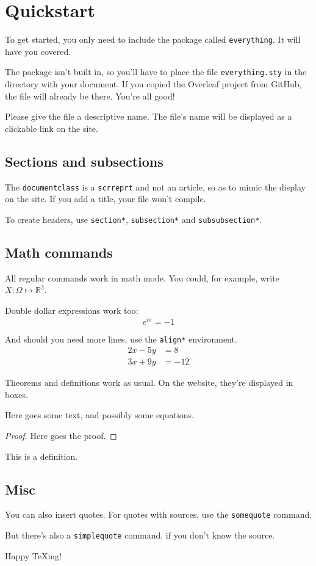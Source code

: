 \documentclass{scrreprt}
\begin{document}
\section*{Quickstart}
To get started, you only need to include the package called \texttt{everything}. It will have you covered.

The package isn't built in, so you'll have to place the file \texttt{everything.sty} in the directory with your document. If you copied the Overleaf project from GitHub, the file will already be there. You're all good!

Please give the file a descriptive name. The file's name will be displayed as a clickable link on the site.

\subsection*{Sections and subsections}
The \texttt{documentclass} is a \texttt{scrreprt} and not an article, so as to mimic the display on the site. If you add a title, your file won't compile. 

To create headers, use \texttt{section*}, \texttt{subsection*} and \texttt{subsubsection*}.

\subsection*{Math commands}
All regular commands work in math mode. You could, for example, write $X: \Omega \mapsto \mathbb{R}^2$.

Double dollar expressions work too:
$$e^{i \pi} = -1$$

And should you need more lines, use the \texttt{align*} environment.
\begin{align*} 
2x - 5y &=  8 \\ 
3x + 9y &=  -12
\end{align*}

Theorems and definitions work as usual. On the website, they're displayed in boxes.

\begin{theorem}
Here goes some text, and possibly some equations.
\end{theorem}
\begin{proof}
Here goes the proof.
\end{proof}

\begin{definition}[A definition]
This is a definition.
\end{definition}

\subsection*{Misc}
You can also insert quotes. For quotes with sources, use the \texttt{somequote} command.


But there's also a \texttt{simplequote} command, if you don't know the source.


Happy TeXing!
\end{document}
